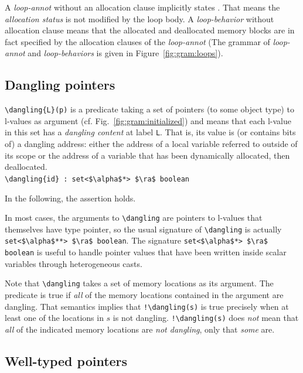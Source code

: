 A {\sl loop-annot} without an allocation clause implicitly states \Loop \allocates \nothing.
That means the {\sl allocation status} is not modified by the loop body.
A {\sl loop-behavior} without allocation clause means that
the allocated and deallocated memory blocks are in fact specified by the allocation clauses
of the {\sl loop-annot}
(The grammar of {\sl loop-annot} and {\sl loop-behaviors} is given in Figure~\ref{fig:gram:loops}).

\subsection{Dangling pointers}
\label{sec:dangling_pointers}
\lstinline|\dangling{L}(p)|
is a predicate taking a set of pointers (to some object type) to l-values as
argument (cf. Fig.~\ref{fig:gram:initialized}) and means that each l-value in this set has a \emph{dangling
  content} at label \lstinline|L|. That is, its value is (or contains bits
of) a dangling address: either the address of a local
variable referred to outside of its scope or the address of a variable that
has been dynamically allocated, then deallocated.
\\ \makebox[5mm]{} \lstinline|\dangling{id} : set<$\alpha$*> $\ra$ boolean|

\begin{example}
  In the following, the assertion holds.
\end{example}

In most cases, the arguments to \lstinline|\dangling| are pointers to
l-values that themselves have type pointer, so the usual signature
of \lstinline|\dangling| is actually
\lstinline|set<$\alpha$**> $\ra$ boolean|.
The signature \lstinline|set<$\alpha$*> $\ra$ boolean| is useful to handle
pointer values that have been written inside scalar variables through
heterogeneous casts.

Note that \lstinline|\dangling| takes a set of memory locations as its argument.
The predicate is true if \emph{all} of the memory locations contained in the argument are dangling. That
semantics implies that \lstinline|!\dangling(s)| is true precisely when at least one
of the locations in $s$ is not dangling. \lstinline|!\dangling(s)| does \emph{not} mean that
\emph{all} of the indicated memory locations are \emph{not dangling}, only that \emph{some} are.

\subsection{Well-typed pointers}
\label{sec:welltyped}
\experimental
{}


